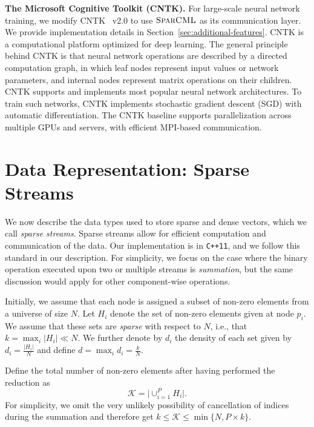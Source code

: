 \documentclass[11pt]{article}
\renewcommand{\paragraph}[1]{\vspace{0.1em} \noindent \textbf{#1}}
\newcommand{\mml}{$\textsc{SparCML}$}
\begin{document}
\paragraph{The Microsoft Cognitive Toolkit (CNTK).} For large-scale
neural network training, we modify  
CNTK~\cite{CNTK} v2.0 to use \mml{} as its communication layer. We provide implementation details in Section~\ref{sec:additional-features}. CNTK is a computational platform optimized for deep learning. 
The general principle behind CNTK is that neural network operations  are described by a directed computation graph, in which leaf nodes represent input values or network parameters, and internal nodes represent matrix operations on their children. 
CNTK supports and implements most popular neural network architectures. To train such networks, CNTK implements stochastic gradient descent (SGD) with automatic differentiation. 
The CNTK baseline supports parallelization across multiple GPUs and servers, with efficient MPI-based communication.

\section{Data Representation: Sparse Streams}

We now describe the data types used to store sparse and
dense vectors, which we call \emph{sparse streams}. Sparse streams allow
for efficient computation and communication of the data. Our
implementation  is in \verb|C++11|, and we follow this standard in our
description. For simplicity, we focus on the case where the binary
operation executed upon two or multiple streams is \emph{summation}, but the same discussion would apply for other component-wise operations. 

Initially, we assume that each node is assigned a subset of non-zero
elements from a universe of size $N$. Let $H_i$ denote the set of
non-zero elements given at node $p_i$. We assume that these sets are
\emph{sparse} with respect to $N$, i.e., that $k = \max_i \vert H_i
\vert \ll N$. We further denote by $d_i$ the density of each set given
by $d_i = \frac{\vert H_i \vert}{N}$ and define $d = \max_{i} d_i =
\frac{k}{N}$.

Define the total number of non-zero elements after having performed the
reduction as $$\mathcal{K} = \vert \cup_{i=1}^P H_i \vert.$$ For
simplicity, we omit the very unlikely possibility of cancellation of
indices during the summation and therefore get $k \leq \mathcal{K} \leq \min \{N, P \times k\}.$ 
\end{document}

